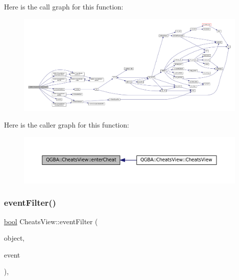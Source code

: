 Here is the call graph for this function\+:
\nopagebreak
\begin{figure}[H]
\begin{center}
\leavevmode
\includegraphics[width=350pt]{class_q_g_b_a_1_1_cheats_view_afac456331945de2dffbd8a51aa87f5c2_cgraph}
\end{center}
\end{figure}
Here is the caller graph for this function\+:
\nopagebreak
\begin{figure}[H]
\begin{center}
\leavevmode
\includegraphics[width=350pt]{class_q_g_b_a_1_1_cheats_view_afac456331945de2dffbd8a51aa87f5c2_icgraph}
\end{center}
\end{figure}
\mbox{\label{class_q_g_b_a_1_1_cheats_view_a8fe7318a8e3e5e95e6555198cd94c8c1}} 
\subsubsection{\texorpdfstring{event\+Filter()}{eventFilter()}}
{\footnotesize\ttfamily \mbox{\hyperlink{libretro_8h_a4a26dcae73fb7e1528214a068aca317e}{bool}} Cheats\+View\+::event\+Filter (\begin{DoxyParamCaption}\item[{Q\+Object $\ast$}]{object,  }\item[{Q\+Event $\ast$}]{event }\end{DoxyParamCaption})\hspace{0.3cm}{\ttfamily [override]}, {\ttfamily [virtual]}}

